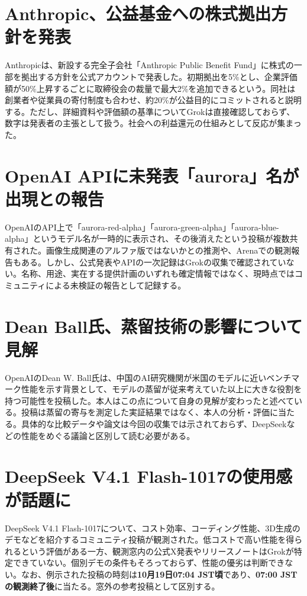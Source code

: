 \section{Anthropic、公益基金への株式拠出方針を発表}
Anthropicは、新設する完全子会社「Anthropic Public Benefit Fund」に株式の一部を拠出する方針を公式アカウントで発表した。初期拠出を5\%とし、企業評価額が50\%上昇するごとに取締役会の裁量で最大2\%を追加できるという。同社は創業者や従業員の寄付制度も合わせ、約20\%が公益目的にコミットされると説明する。ただし、詳細資料や評価額の基準についてGrokは直接確認しておらず、数字は発表者の主張として扱う。社会への利益還元の仕組みとして反応が集まった。

\section{OpenAI APIに未発表「aurora」名が出現との報告}
OpenAIのAPI上で「aurora-red-alpha」「aurora-green-alpha」「aurora-blue-alpha」というモデル名が一時的に表示され、その後消えたという投稿が複数共有された。画像生成関連のアルファ版ではないかとの推測や、Arenaでの観測報告もある。しかし、公式発表やAPIの一次記録はGrokの収集で確認されていない。名称、用途、実在する提供計画のいずれも確定情報ではなく、現時点ではコミュニティによる未検証の報告として記録する。

\section{Dean Ball氏、蒸留技術の影響について見解}
OpenAIのDean W. Ball氏は、中国のAI研究機関が米国のモデルに近いベンチマーク性能を示す背景として、モデルの蒸留が従来考えていた以上に大きな役割を持つ可能性を投稿した。本人はこの点について自身の見解が変わったと述べている。投稿は蒸留の寄与を測定した実証結果ではなく、本人の分析・評価に当たる。具体的な比較データや論文は今回の収集では示されておらず、DeepSeekなどの性能をめぐる議論と区別して読む必要がある。

\section{DeepSeek V4.1 Flash-1017の使用感が話題に}
DeepSeek V4.1 Flash-1017について、コスト効率、コーディング性能、3D生成のデモなどを紹介するコミュニティ投稿が観測された。低コストで高い性能を得られるという評価がある一方、観測窓内の公式X発表やリリースノートはGrokが特定できていない。個別デモの条件もそろっておらず、性能の優劣は判断できない。なお、例示された投稿の時刻は\textbf{10月19日07:04 JST頃}であり、\textbf{07:00 JSTの観測終了後}に当たる。窓外の参考投稿として区別する。


